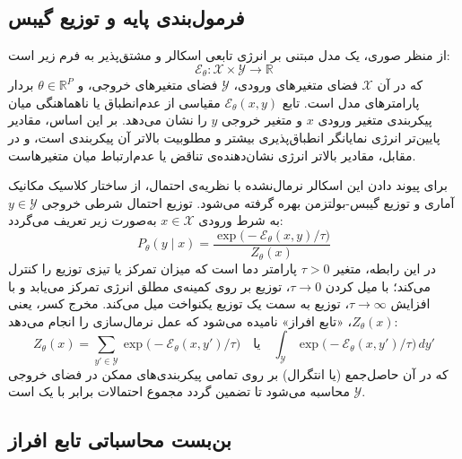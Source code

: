\subsection{فرمول‌بندی پایه و توزیع گیبس}\label{sec:2-4-1}

از منظر صوری، یک مدل مبتنی بر انرژی تابعی اسکالر و مشتق‌پذیر به فرم زیر است:
\begin{equation}\label{eq:chap2_ebm_func_def}
    \mathcal{E}_\theta : \mathcal{X} \times \mathcal{Y} \to \mathbb{R}
\end{equation}
که در آن $\mathcal{X}$ فضای متغیرهای ورودی، $\mathcal{Y}$ فضای متغیرهای خروجی، و $\theta \in \mathbb{R}^P$ بردار پارامترهای مدل است. تابع $\mathcal{E}_\theta(x, y)$ مقیاسی از عدم‌انطباق یا ناهماهنگی میان پیکربندی متغیر ورودی $x$ و متغیر خروجی $y$ را نشان می‌دهد. بر این اساس، مقادیر پایین‌تر انرژی نمایانگر انطباق‌پذیری بیشتر و مطلوبیت بالاتر آن پیکربندی است، و در مقابل، مقادیر بالاتر انرژی نشان‌دهنده‌ی تناقض یا عدم‌ارتباط میان متغیرهاست.

برای پیوند دادن این اسکالر نرمال‌نشده با نظریه‌ی احتمال، از ساختار کلاسیک مکانیک آماری و توزیع گیبس-بولتزمن بهره گرفته می‌شود. توزیع احتمال شرطی خروجی $y \in \mathcal{Y}$ به شرط ورودی $x \in \mathcal{X}$ به‌صورت زیر تعریف می‌گردد:
\begin{equation}\label{eq:chap2_ebm_prob}
    P_\theta(y \mid x) = \frac{\exp\big( -\mathcal{E}_\theta(x, y) / \tau \big)}{Z_\theta(x)}
\end{equation}
در این رابطه، متغیر $\tau > 0$ پارامتر دما است که میزان تمرکز یا تیزی توزیع را کنترل می‌کند؛ با میل کردن $\tau \to 0$، توزیع بر روی کمینه‌ی مطلق انرژی تمرکز می‌یابد و با افزایش $\tau \to \infty$، توزیع به سمت یک توزیع یکنواخت میل می‌کند. مخرج کسر، یعنی $Z_\theta(x)$، «تابع افراز» نامیده می‌شود که عمل نرمال‌سازی را انجام می‌دهد:
\begin{equation}\label{eq:chap2_partition_func}
    Z_\theta(x) = \sum_{y' \in \mathcal{Y}} \exp\big( -\mathcal{E}_\theta(x, y') / \tau \big) \quad \text{یا} \quad \int_{\mathcal{Y}} \exp\big( -\mathcal{E}_\theta(x, y') / \tau \big) \, dy'
\end{equation}
که در آن حاصل‌جمع (یا انتگرال) بر روی تمامی پیکربندی‌های ممکن در فضای خروجی $\mathcal{Y}$ محاسبه می‌شود تا تضمین گردد مجموع احتمالات برابر با یک است.


\subsection{بن‌بست محاسباتی تابع افراز}\label{sec:2-4-2}


